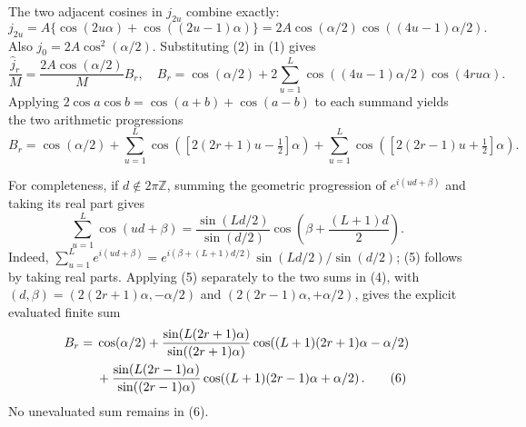 \documentclass[11pt]{article}
\begin{document}
The two adjacent cosines in $j_{2u}$ combine exactly:
\[
 j_{2u}=A\{\cos(2u\alpha)+\cos((2u-1)\alpha)\}
      =2A\cos(\alpha/2)\cos((4u-1)\alpha/2). \tag{2}
\]
Also $j_0=2A\cos^2(\alpha/2)$. Substituting (2) in (1) gives
\[
 \frac{\widehat j_r}{M}=\frac{2A\cos(\alpha/2)}{M}B_r,
 \quad
 B_r=\cos(\alpha/2)+2\sum_{u=1}^{L}
 \cos((4u-1)\alpha/2)\cos(4ru\alpha). \tag{3}
\]
Applying $2\cos a\cos b=\cos(a+b)+\cos(a-b)$ to each summand yields the two arithmetic progressions
\[
 B_r=\cos(\alpha/2)
 +\sum_{u=1}^{L}\cos\!\left(\left[2(2r+1)u-\tfrac12\right]\alpha\right)
 +\sum_{u=1}^{L}\cos\!\left(\left[2(2r-1)u+\tfrac12\right]\alpha\right). \tag{4}
\]

For completeness, if $d\notin2\pi\mathbb Z$, summing the geometric progression of $e^{i(ud+\beta)}$ and taking its real part gives
\[
 \sum_{u=1}^{L}\cos(ud+\beta)
 =\frac{\sin(Ld/2)}{\sin(d/2)}
  \cos\!\left(\beta+\frac{(L+1)d}{2}\right). \tag{5}
\]
Indeed, $\sum_{u=1}^L e^{i(ud+\beta)}=e^{i(\beta+(L+1)d/2)}\sin(Ld/2)/\sin(d/2)$; (5) follows by taking real parts. Applying (5) separately to the two sums in (4), with $(d,\beta)=(2(2r+1)\alpha,-\alpha/2)$ and $(2(2r-1)\alpha,+\alpha/2)$, gives the explicit evaluated finite sum
\begin{align}
 B_r={}&\cos(\alpha/2)
 +\frac{\sin(L(2r+1)\alpha)}{\sin((2r+1)\alpha)}
   \cos\!\left((L+1)(2r+1)\alpha-\alpha/2\right)\notag\\
 &+\frac{\sin(L(2r-1)\alpha)}{\sin((2r-1)\alpha)}
   \cos\!\left((L+1)(2r-1)\alpha+\alpha/2\right). \tag{6}
\end{align}
No unevaluated sum remains in (6).
\end{document}
